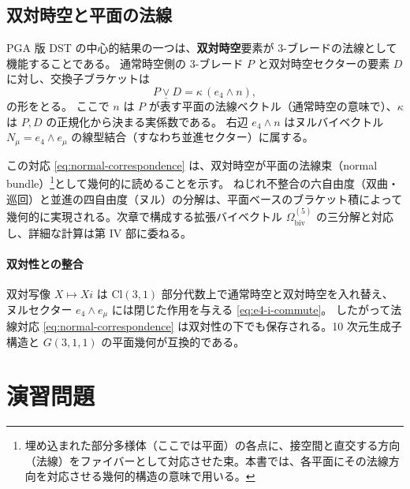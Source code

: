 \documentclass[dvipdfmx,a4paper,oneside]{jsbook}
\numberwithin{equation}{chapter}
\begin{document}
\subsection{双対時空と平面の法線}

PGA 版 DST の中心的結果の一つは、\textbf{双対時空}要素が 3-ブレードの法線として機能することである。
通常時空側の 3-ブレード \(P\) と双対時空セクターの要素 \(D\) に対し、交換子ブラケットは
\begin{equation}
  P \mathbin{\underline{\vee}} D = \kappa\,(e_4 \wedge n),
  \label{eq:normal-correspondence}
\end{equation}
の形をとる。
ここで \(n\) は \(P\) が表す平面の法線ベクトル（通常時空の意味で）、\(\kappa\) は \(P, D\) の正規化から決まる実係数である。
右辺 \(e_4 \wedge n\) はヌルバイベクトル \(N_\mu = e_4 \wedge e_\mu\) の線型結合（すなわち並進セクター）に属する。

この対応 \eqref{eq:normal-correspondence} は、双対時空が平面の法線束（normal bundle）\footnote{埋め込まれた部分多様体（ここでは平面）の各点に、接空間と直交する方向（法線）をファイバーとして対応させた束。本書では、各平面にその法線方向を対応させる幾何的構造の意味で用いる。}として幾何的に読めることを示す。
ねじれ不整合の六自由度（双曲・巡回）と並進の四自由度（ヌル）の分解は、平面ベースのブラケット積によって幾何的に実現される。次章で構成する拡張バイベクトル \(\Omega_{\mathrm{biv}}^{(5)}\) の三分解と対応し、詳細な計算は第 IV 部に委ねる。

\paragraph{双対性との整合}
双対写像 \(X \mapsto Xi\) は \(\mathrm{Cl}(3,1)\) 部分代数上で通常時空と双対時空を入れ替え、ヌルセクター \(e_4 \wedge e_\mu\) には閉じた作用を与える \eqref{eq:e4-i-commute}。
したがって法線対応 \eqref{eq:normal-correspondence} は双対性の下でも保存される。10 次元生成子構造と \(G(3,1,1)\) の平面幾何が互換的である。

\section*{演習問題}
\end{document}
